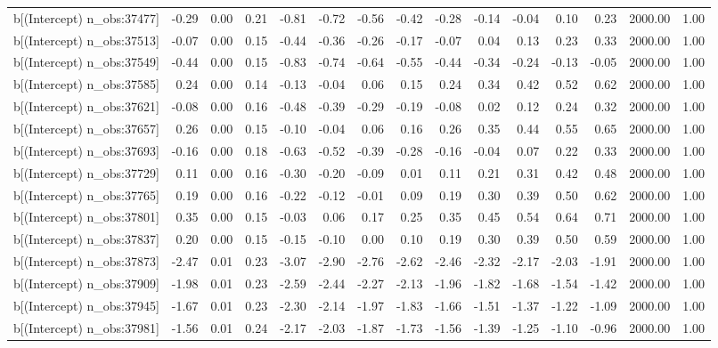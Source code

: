 \begin{table}[ht]
\begin{tabular}{rrrrrrrrrrrrrrr}
  b[(Intercept) n\_obs:37477] & -0.29 & 0.00 & 0.21 & -0.81 & -0.72 & -0.56 & -0.42 & -0.28 & -0.14 & -0.04 & 0.10 & 0.23 & 2000.00 & 1.00 \\ 
  b[(Intercept) n\_obs:37513] & -0.07 & 0.00 & 0.15 & -0.44 & -0.36 & -0.26 & -0.17 & -0.07 & 0.04 & 0.13 & 0.23 & 0.33 & 2000.00 & 1.00 \\ 
  b[(Intercept) n\_obs:37549] & -0.44 & 0.00 & 0.15 & -0.83 & -0.74 & -0.64 & -0.55 & -0.44 & -0.34 & -0.24 & -0.13 & -0.05 & 2000.00 & 1.00 \\ 
  b[(Intercept) n\_obs:37585] & 0.24 & 0.00 & 0.14 & -0.13 & -0.04 & 0.06 & 0.15 & 0.24 & 0.34 & 0.42 & 0.52 & 0.62 & 2000.00 & 1.00 \\ 
  b[(Intercept) n\_obs:37621] & -0.08 & 0.00 & 0.16 & -0.48 & -0.39 & -0.29 & -0.19 & -0.08 & 0.02 & 0.12 & 0.24 & 0.32 & 2000.00 & 1.00 \\ 
  b[(Intercept) n\_obs:37657] & 0.26 & 0.00 & 0.15 & -0.10 & -0.04 & 0.06 & 0.16 & 0.26 & 0.35 & 0.44 & 0.55 & 0.65 & 2000.00 & 1.00 \\ 
  b[(Intercept) n\_obs:37693] & -0.16 & 0.00 & 0.18 & -0.63 & -0.52 & -0.39 & -0.28 & -0.16 & -0.04 & 0.07 & 0.22 & 0.33 & 2000.00 & 1.00 \\ 
  b[(Intercept) n\_obs:37729] & 0.11 & 0.00 & 0.16 & -0.30 & -0.20 & -0.09 & 0.01 & 0.11 & 0.21 & 0.31 & 0.42 & 0.48 & 2000.00 & 1.00 \\ 
  b[(Intercept) n\_obs:37765] & 0.19 & 0.00 & 0.16 & -0.22 & -0.12 & -0.01 & 0.09 & 0.19 & 0.30 & 0.39 & 0.50 & 0.62 & 2000.00 & 1.00 \\ 
  b[(Intercept) n\_obs:37801] & 0.35 & 0.00 & 0.15 & -0.03 & 0.06 & 0.17 & 0.25 & 0.35 & 0.45 & 0.54 & 0.64 & 0.71 & 2000.00 & 1.00 \\ 
  b[(Intercept) n\_obs:37837] & 0.20 & 0.00 & 0.15 & -0.15 & -0.10 & 0.00 & 0.10 & 0.19 & 0.30 & 0.39 & 0.50 & 0.59 & 2000.00 & 1.00 \\ 
  b[(Intercept) n\_obs:37873] & -2.47 & 0.01 & 0.23 & -3.07 & -2.90 & -2.76 & -2.62 & -2.46 & -2.32 & -2.17 & -2.03 & -1.91 & 2000.00 & 1.00 \\ 
  b[(Intercept) n\_obs:37909] & -1.98 & 0.01 & 0.23 & -2.59 & -2.44 & -2.27 & -2.13 & -1.96 & -1.82 & -1.68 & -1.54 & -1.42 & 2000.00 & 1.00 \\ 
  b[(Intercept) n\_obs:37945] & -1.67 & 0.01 & 0.23 & -2.30 & -2.14 & -1.97 & -1.83 & -1.66 & -1.51 & -1.37 & -1.22 & -1.09 & 2000.00 & 1.00 \\ 
  b[(Intercept) n\_obs:37981] & -1.56 & 0.01 & 0.24 & -2.17 & -2.03 & -1.87 & -1.73 & -1.56 & -1.39 & -1.25 & -1.10 & -0.96 & 2000.00 & 1.00 \\ 

\end{tabular}
\end{table}
